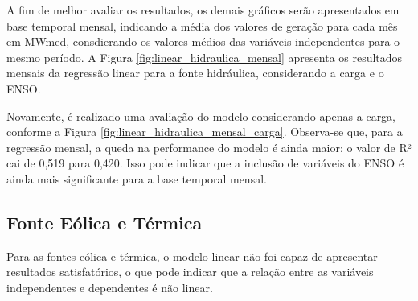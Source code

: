 A fim de melhor avaliar os resultados, os demais gráficos serão apresentados em base temporal mensal, indicando a média 
dos valores de geração para cada mês em MWmed, consdierando os valores médios das variáveis independentes para o mesmo período. 
A Figura \ref{fig:linear_hidraulica_mensal} apresenta os resultados mensais da regressão linear para a fonte hidráulica, 
considerando a carga e o ENSO. 

\begin{figure}[!ht]
  {}
  {}
\end{figure}
\begin{figure}[!ht]
  {}
  {}
\end{figure}

Novamente, é realizado uma avaliação do modelo considerando apenas a carga, conforme a Figura 
\ref{fig:linear_hidraulica_mensal_carga}. Observa-se que, para a regressão mensal, a queda na performance do modelo é ainda
maior: o valor de R² cai de 0,519 para 0,420. Isso pode indicar que a inclusão de variáveis do ENSO é ainda mais significante 
para a base temporal mensal.

\subsection{Fonte Eólica e Térmica}
Para as fontes eólica e térmica, o modelo linear não foi capaz de apresentar resultados satisfatórios, o que pode indicar
que a relação entre as variáveis independentes e dependentes é não linear.

\begin{figure}[!ht]
  {}
  {}
\end{figure}
\begin{figure}[!ht]
  {}
  {}
\end{figure}

